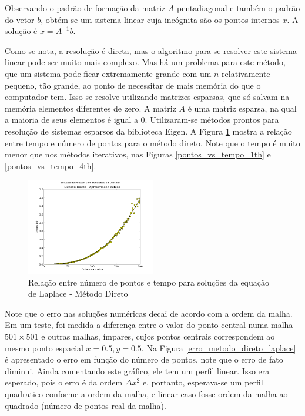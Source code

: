 \documentclass[journal]{IEEEtran}
\begin{document}
Observando o padrão de formação da matriz $A$ pentadiagonal e também o padrão do vetor $b$, obtém-se um sistema linear cuja incógnita são os pontos internos $x$. A solução é $x=A^{-1}b$.

Como se nota, a resolução é direta, mas o algoritmo para se resolver este sistema linear pode ser muito mais complexo. Mas há um problema para este método, que um sistema pode ficar extremamente grande com um $n$ relativamente pequeno, tão grande, ao ponto de necessitar de mais memória do que o computador tem. Isso se resolve utilizando matrizes esparsas, que só salvam na memória elementos diferentes de zero. A matriz $A$ é uma matriz esparsa, na qual a maioria de seus elementos é igual a 0. Utilizaram-se métodos prontos para resolução de sistemas esparsos da biblioteca Eigen. A Figura \ref{pontos_vs_tempo_direto} mostra a relação entre tempo e número de pontos para o método direto. Note que o tempo é muito menor que nos métodos iterativos, nas Figuras \ref{pontos_vs_tempo_1th} e \ref{pontos_vs_tempo_4th}.

\begin{figure}[ht!]
\centering
\includegraphics[width = 0.5\textwidth]{figures/poisson_dirichlet_metodo_direto.png}
\caption{Relação entre número de pontos e tempo para soluções da equação de Laplace - Método Direto\label{pontos_vs_tempo_direto}}
\end{figure}

Note que o erro nas soluções numéricas decai de acordo com a ordem da malha. Em um teste, foi medida a diferença entre o valor do ponto central numa malha $501\times 501$ e outras malhas, ímpares, cujos pontos centrais correspondem ao mesmo ponto espacial $x=0.5, y=0.5$.  Na Figura \ref{erro_metodo_direto_laplace} é apresentado o erro em função do número de pontos, note que o erro de fato diminui. Ainda comentando este gráfico, ele tem um perfil linear.  Isso era esperado, pois o erro é da ordem $\Delta x^2$ e, portanto, esperava-se um perfil quadratico conforme a ordem da malha, e linear caso fosse ordem da malha ao quadrado (número de pontos real da malha).
\end{document}
